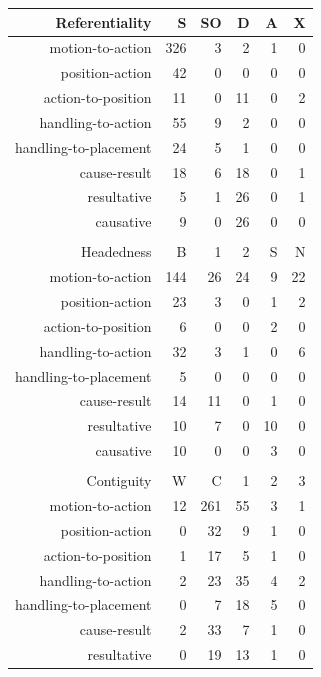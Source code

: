 \begin{table}
\centering
\begin{tabular}{rrrrrr}
  \lsptoprule
Referentiality & S & SO & D & A & X \\ 
  \midrule
  motion-to-action & 326 &   3 &   2 &   1 &   0 \\ 
  position-action &  42 &   0 &   0 &   0 &   0 \\ 
  action-to-position &  11 &   0 &  11 &   0 &   2 \\ 
  handling-to-action &  55 &   9 &   2 &   0 &   0 \\ 
  handling-to-placement &  24 &   5 &   1 &   0 &   0 \\ 
  cause-result &  18 &   6 &  18 &   0 &   1 \\ 
  resultative &   5 &   1 &  26 &   0 &   1 \\ 
  causative &   9 &   0 &  26 &   0 &   0 \\ 
   \midrule
 \\
  \midrule
Headedness & B & 1 & 2 & S & N \\ 
  \midrule
  motion-to-action & 144 &  26 &  24 &   9 &  22 \\ 
  position-action &  23 &   3 &   0 &   1 &   2 \\ 
  action-to-position &   6 &   0 &   0 &   2 &   0 \\ 
  handling-to-action &  32 &   3 &   1 &   0 &   6 \\ 
  handling-to-placement &   5 &   0 &   0 &   0 &   0 \\ 
  cause-result &  14 &  11 &   0 &   1 &   0 \\ 
  resultative &  10 &   7 &   0 &  10 &   0 \\ 
  causative &  10 &   0 &   0 &   3 &   0 \\ 
   \midrule
 \\
  \midrule
Contiguity & W & C & 1 & 2 & 3 \\ 
  \midrule
  motion-to-action &  12 & 261 &  55 &   3 &   1 \\ 
  position-action &   0 &  32 &   9 &   1 &   0 \\ 
  action-to-position &   1 &  17 &   5 &   1 &   0 \\ 
  handling-to-action &   2 &  23 &  35 &   4 &   2 \\ 
  handling-to-placement &   0 &   7 &  18 &   5 &   0 \\ 
  cause-result &   2 &  33 &   7 &   1 &   0 \\ 
  resultative &   0 &  19 &  13 &   1 &   0 \\ 

\end{tabular}
\end{table}
